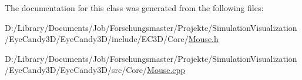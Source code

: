 The documentation for this class was generated from the following files\+:\begin{DoxyCompactItemize}
\item 
D\+:/\+Library/\+Documents/\+Job/\+Forschungsmaster/\+Projekte/\+Simulation\+Visualization/\+Eye\+Candy3\+D/\+Eye\+Candy3\+D/include/\+E\+C3\+D/\+Core/\mbox{\hyperlink{_mouse_8h}{Mouse.\+h}}\item 
D\+:/\+Library/\+Documents/\+Job/\+Forschungsmaster/\+Projekte/\+Simulation\+Visualization/\+Eye\+Candy3\+D/\+Eye\+Candy3\+D/src/\+Core/\mbox{\hyperlink{_mouse_8cpp}{Mouse.\+cpp}}\end{DoxyCompactItemize}
